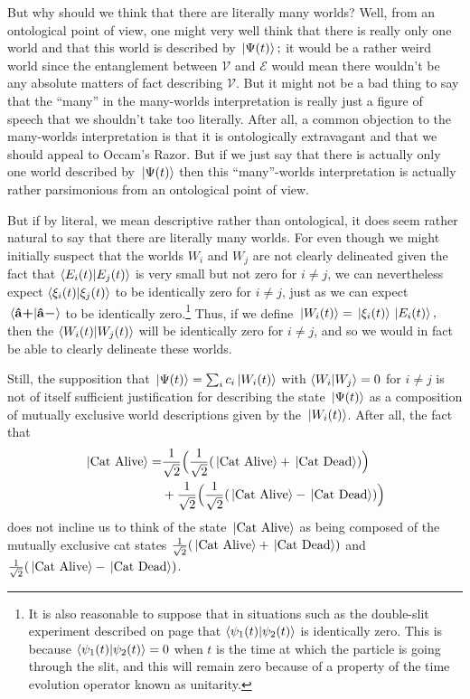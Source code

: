     But why should we think that there are literally many worlds? Well, from an ontological point of view, one might very well think that there is really only one world and that this world is described by $\ket*{\Psi(t)};$ it would be a rather weird world since the entanglement between $\mathcal{V}$ and $\mathcal{E}$ would mean there wouldn't be any absolute matters of fact describing $\mathcal{V}$. But it might not be a bad thing to say that the ``many'' in the many-worlds interpretation is really just a figure of speech that we shouldn't take too literally. After all, a common objection to the many-worlds interpretation is that it is ontologically extravagant and that we should appeal to Occam's Razor. But if we just say that there is actually only one world described by $\ket*{\Psi(t)}$ then this ``many''-worlds interpretation is actually rather parsimonious from an ontological point of view. 
    
    But if by literal, we mean descriptive rather than ontological, it does seem rather natural to say that there are literally many worlds. For even though we might initially suspect that the worlds $W_i$ and $W_j$ are not clearly delineated given the fact that $\ip{E_i(t)}{E_j(t)}$ is very small but not zero for $i\neq j$, we can nevertheless expect $\ip{\xi_i(t)}{\xi_j(t)}$ to be identically zero for $i\neq j$, just as we can expect $\ip*{\uvbp{a}}{\uvbm{a}}$ to be identically zero.\footnote{It is also reasonable to suppose that in situations such as the double-slit experiment described on page \pageref{psi_slit} that $\ip{\psi_1(t)}{\psi_2(t)}$ is identically zero. This is because $\ip{\psi_1(t)}{\psi_2(t)}=0$ when $t$ is the time at which the particle is going through the slit, and this will remain zero because of a property of the time evolution operator known as unitarity.} Thus, if we define $\ket*{W_i(t)}=\ket*{\xi_i(t)}\ket*{E_i(t)},$ then the $\ip{W_i(t)}{W_j(t)}$ will be identically zero for $i\neq j$, and so we would in fact be able to clearly delineate these worlds.
    
    Still, the supposition that $\ket*{\Psi(t)}= \sum_i c_i\ket*{W_i(t)}$  with $\ip{W_i}{W_j}=0$ for $i\neq j$ is not of itself sufficient justification for describing the state $\ket*{\Psi(t)}$ as a composition of mutually exclusive world descriptions given by the $\ket*{W_i(t)}$. After all, the fact that
    \begin{align*}\ket*{\text{Cat Alive}}= &\frac{1}{\sqrt{2}}\Big(\frac{1}{\sqrt{2}}(\ket*{\text{Cat Alive}}+\ket*{\text{Cat Dead}})\Big)\\&+\frac{1}{\sqrt{2}}\Big( \frac{1}{\sqrt{2}}(\ket*{\text{Cat Alive}}-\ket*{\text{Cat Dead}})\Big) \end{align*} does not incline us to think of the state $\ket*{\text{Cat Alive}}$ as being composed of the mutually exclusive cat states  $\frac{1}{\sqrt{2}}(\ket*{\text{Cat Alive}}+\ket*{\text{Cat Dead}})$ and $\frac{1}{\sqrt{2}}(\ket*{\text{Cat Alive}}-\ket*{\text{Cat Dead}})$. 
    
